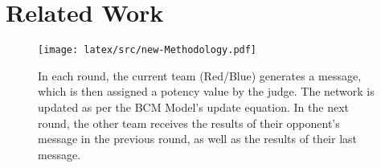 \section{Related Work}
\begin{figure}[t]
    \centering
        \texttt{[image: latex/src/new-Methodology.pdf]}
        \vspace{-0.3cm}
    \caption{In each round, the current team (Red/Blue) generates a message, which is then assigned a potency value by the judge. The network is updated as per the BCM Model's update equation. In the next round, the other team receives the results of their opponent's message in the previous round, as well as the results of their last message.}
    \label{fig:pipeline}
    \vspace{-0.3cm}
\end{figure}